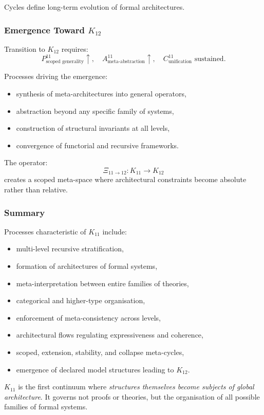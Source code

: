 Cycles define long-term evolution of formal architectures.

\subsubsection{Emergence Toward $K_{12}$}

Transition to $K_{12}$ requires:
\[
P^{11}_{\text{scoped generality}} \uparrow,\quad
A^{11}_{\text{meta-abstraction}} \uparrow,\quad
C^{11}_{\text{unification}} \text{ sustained.}
\]

Processes driving the emergence:
\begin{itemize}
    \item synthesis of meta-architectures into general operators,
    \item abstraction beyond any specific family of systems,
    \item construction of structural invariants at all levels,
    \item convergence of functorial and recursive frameworks.
\end{itemize}

The operator:
\[
\Xi_{11 \to 12} : K_{11} \rightarrow K_{12}
\]
creates a scoped meta-space where architectural constraints
become absolute rather than relative.

\subsubsection{Summary}

Processes characteristic of $K_{11}$ include:
\begin{itemize}
    \item multi-level recursive stratification,
    \item formation of architectures of formal systems,
    \item meta-interpretation between entire families of theories,
    \item categorical and higher-type organisation,
    \item enforcement of meta-consistency across levels,
    \item architectural flows regulating expressiveness and coherence,
    \item scoped, extension, stability, and collapse meta-cycles,
    \item emergence of declared model structures leading to $K_{12}$.
\end{itemize}

$K_{11}$ is the first continuum where \emph{structures themselves become subjects of global architecture}.
It governs not proofs or theories, but the organisation of all possible families of formal systems.
